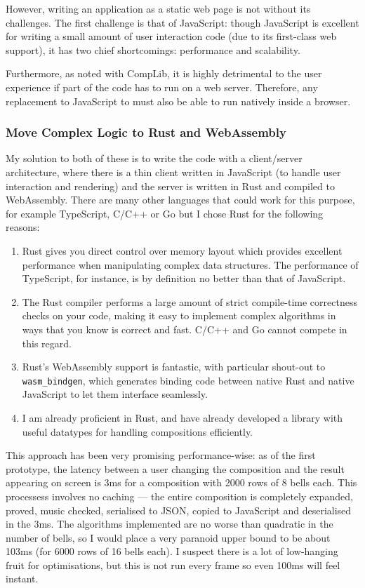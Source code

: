 \documentclass[12pt]{article}
\begin{document}
However, writing an application as a static web page is not without its challenges.  The first
challenge is that of JavaScript: though JavaScript is excellent for writing a small amount of user
interaction code (due to its first-class web support), it has two chief shortcomings: performance
and scalability.

Furthermore, as noted with CompLib, it is highly detrimental to the user experience if part of the
code has to run on a web server.  Therefore, any replacement to JavaScript to must also be able to
run natively inside a browser.

\subsubsection{Move Complex Logic to Rust and WebAssembly}

My solution to both of these is to write the code with a client/server architecture, where there is
a thin client written in JavaScript (to handle user interaction and rendering) and the server is
written in Rust and compiled to WebAssembly.  There are many other languages that could work for
this purpose, for example TypeScript, C/C++ or Go but I chose Rust for the following reasons:

\begin{enumerate}
    \item Rust gives you direct control over memory layout which provides excellent performance when
        manipulating complex data structures.  The performance of TypeScript, for instance, is by
        definition no better than that of JavaScript.
    \item The Rust compiler performs a large amount of strict compile-time correctness checks on
        your code, making it easy to implement complex algorithms in ways that you know is correct
        and fast.  C/C++ and Go cannot compete in this regard.
    \item Rust's WebAssembly support is fantastic, with particular shout-out to \verb|wasm_bindgen|,
        which generates binding code between native Rust and native JavaScript to let them interface
        seamlessly.
    \item I am already proficient in Rust, and have already developed a library with useful
        datatypes for handling compositions efficiently.
\end{enumerate}

This approach has been very promising performance-wise: as of the first prototype, the latency
between a user changing the composition and the result appearing on screen is 3ms for a composition
with 2000 rows of 8 bells each.  This processess involves no caching --- the entire composition is
completely expanded, proved, music checked, serialised to JSON, copied to JavaScript and
deserialised in the 3ms.  The algorithms implemented are no worse than quadratic in the number of
bells, so I would place a very paranoid upper bound to be about 103ms (for 6000 rows of 16 bells
each).  I suspect there is a lot of low-hanging fruit for optimisations, but this is not run every
frame so even 100ms will feel instant.
\end{document}
